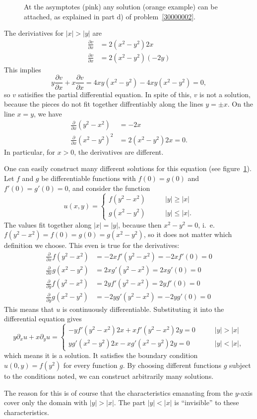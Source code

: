 \begin{loesung}
\begin{teilaufgaben}
\begin{figure}
{At the asymptotes (pink) any solution (orange example) can be attached,
as explained in
part d) of problem~\ref{30000002}.
\label{30000002:solutionfigure}}
\end{figure}
\item
The deriviatives for $|x|>|y|$ are
\begin{align*}
\frac{\partial v}{\partial x}
&=2(x^2-y^2)2x\\
\frac{\partial v}{\partial x}
&=2(x^2-y^2)(-2y)
\end{align*}
This implies
\[
y\frac{\partial v}{\partial x}
+
x \frac{\partial v}{\partial x}
=
4xy(x^2-y^2)
-4xy(x^2-y^2)=0,
\]
so $v$ satisifies the partial differential equation.
In spite of this, $v$ is not a solution, because the pieces do not
fit together diffrentiably along the  lines $y=\pm x$.
On the line $x=y$, we have
\begin{align*}
\frac{\partial}{\partial x}(y^2-x^2)&=-2x\\
\frac{\partial}{\partial x}(x^2-y^2)^2&=2(x^2-y^2)2x=0.
\end{align*}
In particular, for $x>0$, the derivatives are different.
\end{teilaufgaben}

One can easily construct many different solutions for this equation
(see figure~\ref{30000002:solutionfigure}).
Let $f$ and $g$ be differentiable functions with $f(0)=g(0)$
and $f'(0)=g'(0)=0$, and consider the function
\[
u(x,y)=\begin{cases}
f(y^2-x^2)&\qquad |y|\ge|x|\\
g(x^2-y^2)&\qquad |y|\le|x|.
\end{cases}
\]
The values fit together along $|x|=|y|$, because then $x^2-y^2=0$,
i.~e.~$f(y^2-x^2)=f(0)=g(0)=g(x^2-y^2)$, so it does not matter which
definition we choose.
This even is true for the derivatives:
\begin{align*}
\frac{\partial}{\partial x}f(y^2-x^2)&=-2xf'(y^2-x^2)=-2xf'(0)=0
\\
\frac{\partial}{\partial x}g(x^2-y^2)&=2xg'(y^2-x^2)=2xg'(0)=0
\\
\frac{\partial}{\partial y}f(y^2-x^2)&=2yf'(y^2-x^2)=2yf'(0)=0
\\
\frac{\partial}{\partial y}g(x^2-y^2)&=-2yg'(y^2-x^2)=-2yg'(0)=0
\end{align*}
This means that $u$ is continuously differentiable.
Substituting it into the differential equation gives
\[
y\partial_xu+x\partial_yu
=
\begin{cases}
-yf'(y^2-x^2)2x+xf'(y^2-x^2)2y=0&\qquad |y|>|x|\\
yg'(x^2-y^2)2x-xg'(x^2-y^2)2y=0&\qquad |y|<|x|,
\end{cases}
\]
which means it is a solution.
It satisfies the boundary condition $u(0,y)=f(y^2)$ for every function $g$.
By choosing different functions $g$ subject to the conditions noted,
we can construct arbitrarily many solutions.

The reason for this is of course that the characteristics emanating from
the $y$-axis cover only the domain with $|y|> |x|$.
The part $|y|<|x|$ is ``invisible'' to these characteristics.
\end{loesung}

